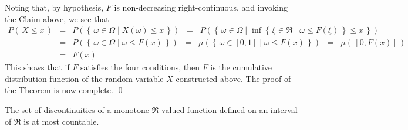 Noting that, by hypothesis, $F$ is non-decreasing right-continuous, and invoking the Claim above, we see that
\begin{eqnarray*}
P\!\left(\,X \leq x\,\right)
&=& P\!\left(\left\{\,\omega\in\Omega\;\vert\; X(\omega) \leq x\,\right\}\right)
\;\;=\;\; P\!\left(\left\{\,\omega\in\Omega\;\vert\; \inf \left\{\,\xi \in \Re \;\vert\; \omega \leq F(\xi)\,\right\} \leq x\,\right\}\right)
\\
&=& P\!\left(\left\{\,\omega\in\Omega\;\vert\; \omega \leq F(x)\,\right\}\right)
\;\;=\;\; \mu\!\left(\left\{\,\omega\in [0,1] \;\vert\; \omega \leq F(x)\,\right\}\right)
\;\;=\;\; \mu\!\left(\,[0,F(x)]\,\right)
\\
&=& F(x)
\end{eqnarray*}
This shows that if $F$ satisfies the four conditions, then $F$ is the cumulative distribution function of the random variable $X$ constructed above.
The proof of the Theorem is now complete.
\qed

\begin{theorem}\mbox{}\vskip 0.1cm
\noindent
The set of discontinuities of a monotone $\Re$-valued function defined on an interval of $\Re$ is at most countable.
\end{theorem}

